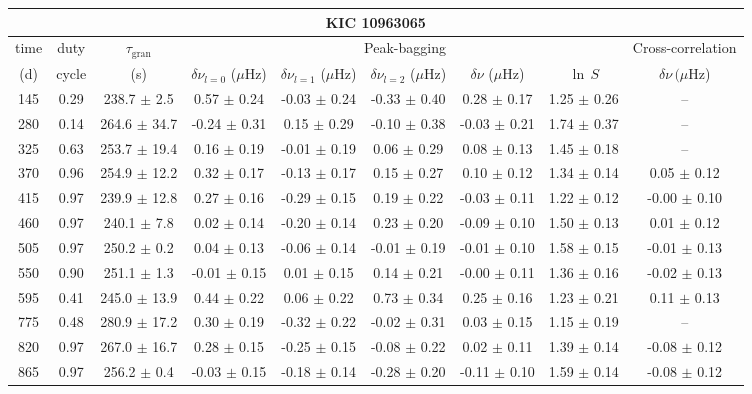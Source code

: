 \documentclass[twocolumn]{aastex61}%
\begin{document}
\begin{table*}[ht]\centering\fontsize{9.}{7.}\selectfont
\begin{tabular}{ccc|ccccc|c}
\multicolumn{9}{c}{KIC 10963065}\\ \hline\hline
time & duty & $\tau_\text{gran}$ &\multicolumn{5}{c|}{Peak-bagging}&Cross-correlation\\
(d)& cycle & (s)&$\delta\nu_{l=0}$ ($\mu$Hz) & $\delta\nu_{l=1}$ ($\mu$Hz) & $\delta\nu_{l=2}$ ($\mu$Hz) & $\delta\nu$ ($\mu$Hz)& $\ln\,S$ & $\delta\nu\,(\mu$Hz)\\\hline
145 & 0.29 & 238.7 $\pm$ 2.5 & 0.57 $\pm$ 0.24 & -0.03 $\pm$ 0.24 & -0.33 $\pm$ 0.40 & 0.28 $\pm$ 0.17 & 1.25 $\pm$ 0.26 & --\\
280 & 0.14 & 264.6 $\pm$ 34.7 & -0.24 $\pm$ 0.31 & 0.15 $\pm$ 0.29 & -0.10 $\pm$ 0.38 & -0.03 $\pm$ 0.21 & 1.74 $\pm$ 0.37 & --\\
325 & 0.63 & 253.7 $\pm$ 19.4 & 0.16 $\pm$ 0.19 & -0.01 $\pm$ 0.19 & 0.06 $\pm$ 0.29 & 0.08 $\pm$ 0.13 & 1.45 $\pm$ 0.18 & --\\
370 & 0.96 & 254.9 $\pm$ 12.2 & 0.32 $\pm$ 0.17 & -0.13 $\pm$ 0.17 & 0.15 $\pm$ 0.27 & 0.10 $\pm$ 0.12 & 1.34 $\pm$ 0.14 & 0.05 $\pm$ 0.12\\
415 & 0.97 & 239.9 $\pm$ 12.8 & 0.27 $\pm$ 0.16 & -0.29 $\pm$ 0.15 & 0.19 $\pm$ 0.22 & -0.03 $\pm$ 0.11 & 1.22 $\pm$ 0.12 & -0.00 $\pm$ 0.10\\
460 & 0.97 & 240.1 $\pm$ 7.8 & 0.02 $\pm$ 0.14 & -0.20 $\pm$ 0.14 & 0.23 $\pm$ 0.20 & -0.09 $\pm$ 0.10 & 1.50 $\pm$ 0.13 & 0.01 $\pm$ 0.12\\
505 & 0.97 & 250.2 $\pm$ 0.2 & 0.04 $\pm$ 0.13 & -0.06 $\pm$ 0.14 & -0.01 $\pm$ 0.19 & -0.01 $\pm$ 0.10 & 1.58 $\pm$ 0.15 & -0.01 $\pm$ 0.13\\
550 & 0.90 & 251.1 $\pm$ 1.3 & -0.01 $\pm$ 0.15 & 0.01 $\pm$ 0.15 & 0.14 $\pm$ 0.21 & -0.00 $\pm$ 0.11 & 1.36 $\pm$ 0.16 & -0.02 $\pm$ 0.13\\
595 & 0.41 & 245.0 $\pm$ 13.9 & 0.44 $\pm$ 0.22 & 0.06 $\pm$ 0.22 & 0.73 $\pm$ 0.34 & 0.25 $\pm$ 0.16 & 1.23 $\pm$ 0.21 & 0.11 $\pm$ 0.13\\
775 & 0.48 & 280.9 $\pm$ 17.2 & 0.30 $\pm$ 0.19 & -0.32 $\pm$ 0.22 & -0.02 $\pm$ 0.31 & 0.03 $\pm$ 0.15 & 1.15 $\pm$ 0.19 & --\\
820 & 0.97 & 267.0 $\pm$ 16.7 & 0.28 $\pm$ 0.15 & -0.25 $\pm$ 0.15 & -0.08 $\pm$ 0.22 & 0.02 $\pm$ 0.11 & 1.39 $\pm$ 0.14 & -0.08 $\pm$ 0.12\\
865 & 0.97 & 256.2 $\pm$ 0.4 & -0.03 $\pm$ 0.15 & -0.18 $\pm$ 0.14 & -0.28 $\pm$ 0.20 & -0.11 $\pm$ 0.10 & 1.59 $\pm$ 0.14 & -0.08 $\pm$ 0.12\\

\end{tabular}
\end{table*}
\end{document}
